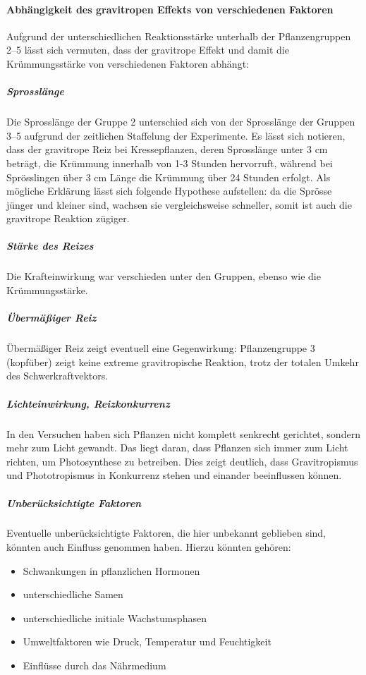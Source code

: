\documentclass[
11pt, 
ngerman,
listof=totocnumbered,
oneside,
bibliography=totocnumbered,
abstracton
]{scrreprt}
\begin{document}
\paragraph{Abhängigkeit des gravitropen Effekts von verschiedenen Faktoren }

Aufgrund der unterschiedlichen Reaktionsstärke unterhalb der Pflanzengruppen 2--5 lässt sich vermuten, dass der gravitrope Effekt und damit die Krümmungsstärke von verschiedenen Faktoren abhängt: 

\subparagraph{Sprosslänge} Die Sprosslänge der Gruppe 2 unterschied sich von der Sprosslänge der Gruppen 3--5 aufgrund der zeitlichen Staffelung der Experimente. Es lässt sich notieren, dass der gravitrope Reiz bei Kressepflanzen, deren Sprosslänge unter 3 cm beträgt, die Krümmung innerhalb von 1-3 Stunden hervorruft, während bei Sprösslingen über 3 cm Länge die Krümmung über 24 Stunden erfolgt. Als mögliche Erklärung lässt sich folgende Hypothese aufstellen: da die Sprösse jünger und kleiner sind, wachsen sie vergleichsweise schneller, somit ist auch die gravitrope Reaktion zügiger. 

\subparagraph{Stärke des Reizes} Die Krafteinwirkung war verschieden unter den Gruppen, ebenso wie die Krümmungsstärke. 

\subparagraph{Übermäßiger Reiz} Übermäßiger Reiz zeigt eventuell eine Gegenwirkung: Pflanzengruppe 3 (kopfüber) zeigt keine extreme gravitropische Reaktion, trotz der totalen Umkehr des Schwerkraftvektors. 

\subparagraph{Lichteinwirkung, Reizkonkurrenz} In den Versuchen haben sich Pflanzen nicht komplett senkrecht gerichtet, sondern mehr zum Licht gewandt. Das liegt daran, dass Pflanzen sich immer zum Licht richten, um Photosynthese zu betreiben. Dies zeigt deutlich, dass Gravitropismus und Phototropismus in Konkurrenz stehen und einander beeinflussen können.

\subparagraph{Unberücksichtigte Faktoren} Eventuelle unberücksichtigte Faktoren, die hier unbekannt geblieben sind, könnten auch Einfluss genommen haben. Hierzu könnten gehören:

\begin{itemize}
\item Schwankungen in pflanzlichen Hormonen
\item unterschiedliche Samen
\item unterschiedliche initiale Wachstumsphasen
\item Umweltfaktoren wie Druck, Temperatur und Feuchtigkeit
\item Einflüsse durch das Nährmedium 
\end{itemize}
\end{document}
